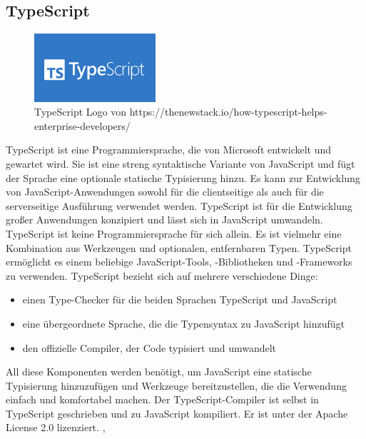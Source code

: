 \subsection{TypeScript}
\begin{figure}
    \begin{center}
      \includegraphics[width=0.4\textwidth]{pics/TS_Logo.png}
      \caption{TypeScript Logo von https://thenewstack.io/how-typescript-helps-enterprise-developers/}
    \end{center}
\end{figure} 
TypeScript ist eine Programmiersprache, die von Microsoft entwickelt und gewartet wird. 
Sie ist eine streng syntaktische Variante von JavaScript und fügt der Sprache eine optionale 
statische Typisierung hinzu. Es kann zur Entwicklung von JavaScript-Anwendungen sowohl für 
die clientseitige als auch für die serverseitige Ausführung verwendet werden. TypeScript ist für 
die Entwicklung großer Anwendungen konzipiert und lässt sich in JavaScript umwandeln. 
\newline
TypeScript ist keine Programmiersprache für sich allein. Es ist vielmehr eine Kombination aus Werkzeugen und 
optionalen, entfernbaren Typen. TypeScript ermöglicht es einem beliebige 
JavaScript-Tools, -Bibliotheken und -Frameworks zu verwenden.
\newline
TypeScript bezieht sich auf mehrere verschiedene Dinge:
\begin{itemize}
    \item einen Type-Checker für die beiden Sprachen TypeScript und JavaScript
    \item eine übergeordnete Sprache, die die Typensyntax zu JavaScript hinzufügt
    \item den offizielle Compiler, der Code typisiert und umwandelt
\end{itemize}
All diese Komponenten werden benötigt, um JavaScript eine statische Typisierung hinzuzufügen 
und Werkzeuge bereitzustellen, die die Verwendung einfach und komfortabel machen.
\newline
Der TypeScript-Compiler ist selbst in TypeScript geschrieben und zu JavaScript kompiliert. Er ist unter der Apache 
License 2.0 lizenziert. \cite{noauthor_typescript_2022}, \cite{noauthor_softwareentwicklung_nodate}

